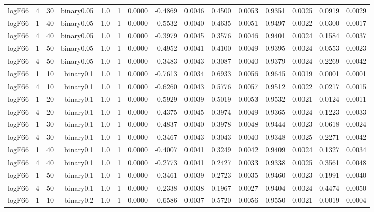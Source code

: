 \begin{longtable}{rrrrrrrrrrrrrrr}
  logF66 & 4 & 30 & binary0.05 & 1.0 & 1 & 0.0000 & -0.4869 & 0.0046 & 0.4500 & 0.0053 & 0.9351 & 0.0025 & 0.0919 & 0.0029 \\ 
  logF66 & 1 & 40 & binary0.05 & 1.0 & 1 & 0.0000 & -0.5532 & 0.0040 & 0.4635 & 0.0051 & 0.9497 & 0.0022 & 0.0300 & 0.0017 \\ 
  logF66 & 4 & 40 & binary0.05 & 1.0 & 1 & 0.0000 & -0.3979 & 0.0045 & 0.3576 & 0.0046 & 0.9401 & 0.0024 & 0.1584 & 0.0037 \\ 
  logF66 & 1 & 50 & binary0.05 & 1.0 & 1 & 0.0000 & -0.4952 & 0.0041 & 0.4100 & 0.0049 & 0.9395 & 0.0024 & 0.0553 & 0.0023 \\ 
  logF66 & 4 & 50 & binary0.05 & 1.0 & 1 & 0.0000 & -0.3483 & 0.0043 & 0.3087 & 0.0040 & 0.9379 & 0.0024 & 0.2269 & 0.0042 \\ 
  logF66 & 1 & 10 & binary0.1 & 1.0 & 1 & 0.0000 & -0.7613 & 0.0034 & 0.6933 & 0.0056 & 0.9645 & 0.0019 & 0.0001 & 0.0001 \\ 
  logF66 & 4 & 10 & binary0.1 & 1.0 & 1 & 0.0000 & -0.6260 & 0.0043 & 0.5776 & 0.0057 & 0.9512 & 0.0022 & 0.0217 & 0.0015 \\ 
  logF66 & 1 & 20 & binary0.1 & 1.0 & 1 & 0.0000 & -0.5929 & 0.0039 & 0.5019 & 0.0053 & 0.9532 & 0.0021 & 0.0124 & 0.0011 \\ 
  logF66 & 4 & 20 & binary0.1 & 1.0 & 1 & 0.0000 & -0.4375 & 0.0045 & 0.3974 & 0.0049 & 0.9365 & 0.0024 & 0.1223 & 0.0033 \\ 
  logF66 & 1 & 30 & binary0.1 & 1.0 & 1 & 0.0000 & -0.4837 & 0.0040 & 0.3978 & 0.0048 & 0.9444 & 0.0023 & 0.0618 & 0.0024 \\ 
  logF66 & 4 & 30 & binary0.1 & 1.0 & 1 & 0.0000 & -0.3467 & 0.0043 & 0.3043 & 0.0040 & 0.9348 & 0.0025 & 0.2271 & 0.0042 \\ 
  logF66 & 1 & 40 & binary0.1 & 1.0 & 1 & 0.0000 & -0.4007 & 0.0041 & 0.3249 & 0.0042 & 0.9409 & 0.0024 & 0.1327 & 0.0034 \\ 
  logF66 & 4 & 40 & binary0.1 & 1.0 & 1 & 0.0000 & -0.2773 & 0.0041 & 0.2427 & 0.0033 & 0.9338 & 0.0025 & 0.3561 & 0.0048 \\ 
  logF66 & 1 & 50 & binary0.1 & 1.0 & 1 & 0.0000 & -0.3461 & 0.0039 & 0.2723 & 0.0035 & 0.9460 & 0.0023 & 0.1991 & 0.0040 \\ 
  logF66 & 4 & 50 & binary0.1 & 1.0 & 1 & 0.0000 & -0.2338 & 0.0038 & 0.1967 & 0.0027 & 0.9404 & 0.0024 & 0.4474 & 0.0050 \\ 
  logF66 & 1 & 10 & binary0.2 & 1.0 & 1 & 0.0000 & -0.6586 & 0.0037 & 0.5720 & 0.0056 & 0.9550 & 0.0021 & 0.0019 & 0.0004 \\ 

\end{longtable}
